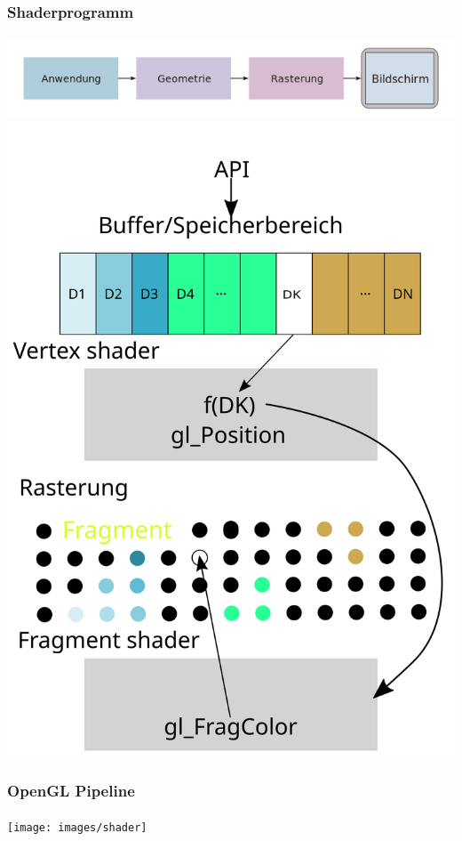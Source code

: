 \documentclass{beamer}
\begin{document}
\begin{frame}
    \frametitle{ Shaderprogramm}
\framesubtitle{}
\begin{center}
\includegraphics[scale=0.26]{images/cgpipeline_grob}
\\
\includegraphics[scale=0.20]{images/Zeichnung_Shaderpipeline}

\end{center}
\end{frame}

\begin{frame}
    \frametitle{OpenGL Pipeline}
\framesubtitle{}
    \begin{block}{}
\begin{center}
\texttt{[image: images/shader]}
\end{center}
\end{block}
\end{frame}
\end{document}
